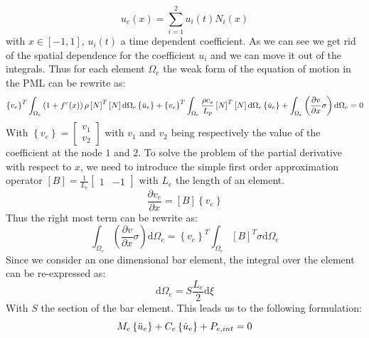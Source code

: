 \begin{equation}
    u_e(x) = \sum_{i=1}^{2}u_i(t) N_i(x)
\end{equation}
with $x\in[-1,1]$, $u_i(t)$ a time dependent coefficient. As we can see we get rid of the spatial dependence for the coefficient $u_i$ and we can move it out of the integrals.  
Thus for each element $\Omega_e$ the weak form of the equation of motion in the PML can be rewrite as:
\begin{equation}
    \left \{ v_e  \right\}^T \int_{\Omega_e} \left ( 1+f^e(x) \right)\rho \left[N\right]^T\left[N \right] \mathrm{d}\Omega_e\left \{ \Ddot{u}_e  \right\} + \left \{ v_e \right\}^T \int_{\Omega_e} \frac{\rho c_s}{ L_p} \left[N\right]^T\left[N \right] \mathrm{d}\Omega_e \left \{ \Dot{u}_e  \right\} + \int_{\Omega_e} \left( \frac{\partial v}{\partial x} \sigma \right)\mathrm{d}\Omega_e =0
\end{equation}
With $\left\{v_e\right\} = \begin{bmatrix} v_1 \\ v_2 \end{bmatrix}$ with $v_1$ and $v_2$ being respectively the value of the coefficient at the node $1$ and $2$.
To solve the problem of the partial derivative with respect to $x$, we need to introduce the simple first order approximation operator $\left[B \right] = \frac{1}{L_e}\begin{bmatrix}1&-1  \end{bmatrix} $ with $L_e$ the length of an element. 
\begin{equation}
    \frac{\partial v_e}{\partial x} = \left[B \right] \left\{ v_e \right\}
\end{equation}
Thus the right most term can be rewrite as:
\begin{equation}
    \int_{\Omega_e} \left( \frac{\partial v}{\partial x} \sigma \right)\mathrm{d}\Omega_e = \left \{ v_e \right\}^T \int_{\Omega_e} \left[B \right]^T \sigma \mathrm{d}\Omega_e
\end{equation}
Since we consider an one dimensional bar element, the integral over the element can be re-expressed as:
\begin{equation}
    \mathrm{d}\Omega_e = S \frac{L_e}{2} \mathrm{d} \xi
\end{equation}
With $S$ the section of the bar element.
This leads us to the following formulation:
\begin{equation}
    M_e\left\{\Ddot{u}_e\right\} + C_e \left\{\Dot{u}_e\right\} + P_{e,int} = 0
\end{equation}
